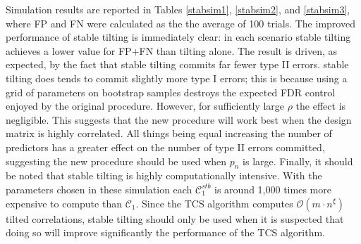 \documentclass[11pt]{report}\usepackage[utf8]{inputenc}
\begin{document}
Simulation results are reported in Tables \ref{stabsim1}, \ref{stabsim2}, and \ref{stabsim3}, where FP and FN were calculated as the the average of 100 trials. The improved performance of stable tilting is immediately clear: in each scenario stable tilting achieves a lower value for FP+FN than tilting alone. The result is driven, as expected, by the fact that stable tilting commits far fewer type II errors. stable tilting does tends to commit slightly more type I errors; this is because using a grid of parameters on bootstrap samples destroys the expected FDR control enjoyed by the original procedure. However, for sufficiently large $\rho$ the effect is negligible. This suggests that the new procedure will work best when the design matrix is highly correlated. All things being equal increasing the number of predictors has a greater effect on the number of type II errors committed, suggesting the new procedure should be used when $p_n$ is large. Finally, it should be noted that stable tilting is highly computationally intensive. With the parameters chosen in these simulation each $\mathcal{C}_1^{stb}$ is around 1,000 times more expensive to compute than $\mathcal{C}_1$. Since the TCS algorithm computes $\mathcal{O}(m \cdot n^\xi)$ tilted correlations, stable tilting should only be used when it is suspected that doing so will improve significantly the performance of the TCS algorithm. 
\end{document}
